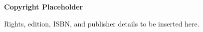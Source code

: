 \cleardoublepage
\thispagestyle{empty}
\null
\vfill
\begin{center}
{\Large\bfseries Copyright Placeholder}

\vspace{1em}
Rights, edition, ISBN, and publisher details to be inserted here.
\end{center}
\vfill
\null
